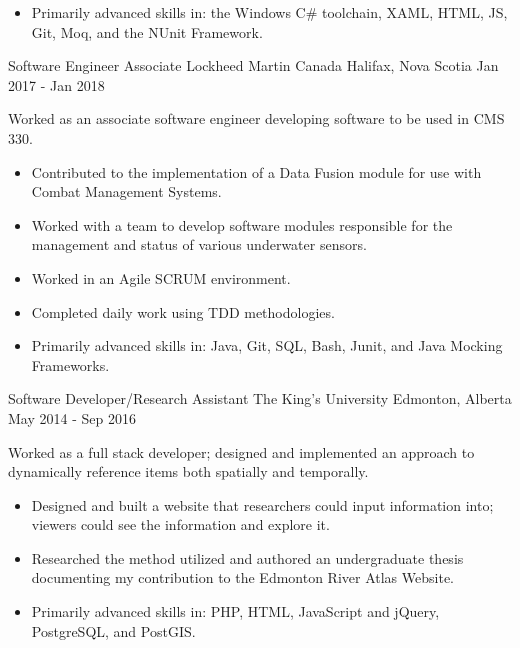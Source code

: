 \begin{cventries}
{\begin{itemize}
                \item Primarily advanced skills in: the Windows C\# toolchain, XAML, HTML, JS, Git, Moq, and the NUnit Framework.
            \end{itemize}
        }
    \cventry
        {Software Engineer Associate}
        {Lockheed Martin Canada}
        {Halifax, Nova Scotia}
        {Jan 2017 - Jan 2018}
        {
            Worked as an associate software engineer developing software to be used in CMS 330.
            \begin{itemize}
                \item Contributed to the implementation of a Data Fusion module for use with Combat Management Systems.
                \item Worked with a team to develop software modules responsible for the management and status of various underwater sensors.
                \item Worked in an Agile SCRUM environment.
                \item Completed daily work using TDD methodologies.
                \item Primarily advanced skills in: Java, Git, SQL, Bash, Junit, and Java Mocking Frameworks.
            \end{itemize}
        }
    \cventry
        {Software Developer/Research Assistant}
        {The King's University}
        {Edmonton, Alberta}
        {May 2014 - Sep 2016}
        {
            Worked as a full stack developer; designed and implemented an approach to dynamically reference items both spatially and temporally.
            \begin{itemize}
                \item Designed and built a website that researchers could input information into; viewers could see the information and explore it.
                \item Researched the method utilized and authored an undergraduate thesis documenting my contribution to the Edmonton River Atlas Website.
                \item Primarily advanced skills in: PHP, HTML, JavaScript and jQuery, PostgreSQL, and PostGIS.
            \end{itemize}
        }

\end{cventries}